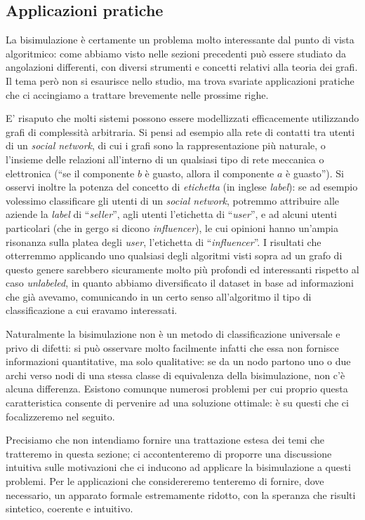 \subsection{Applicazioni pratiche}
La bisimulazione è certamente un problema molto interessante dal punto di vista algoritmico: come abbiamo visto nelle sezioni precedenti può essere studiato da angolazioni differenti, con diversi strumenti e concetti relativi alla teoria dei grafi. Il tema però non si esaurisce nello studio, ma trova svariate applicazioni pratiche che ci accingiamo a trattare brevemente nelle prossime righe.

E' risaputo che molti sistemi possono essere modellizzati efficacemente utilizzando grafi di complessità arbitraria. Si pensi ad esempio alla rete di contatti tra utenti di un \emph{social network}, di cui i grafi sono la rappresentazione più naturale, o l'insieme delle relazioni all'interno di un qualsiasi tipo di rete meccanica o elettronica (``se il componente $b$ è guasto, allora il componente $a$ è guasto''). Si osservi inoltre la potenza del concetto di \emph{etichetta} (in inglese \emph{label}): se ad esempio volessimo classificare gli utenti di un \emph{social network}, potremmo attribuire alle aziende la \emph{label} di ``\emph{seller}'', agli utenti l'etichetta di ``\emph{user}'', e ad alcuni utenti particolari (che in gergo si dicono \emph{influencer}), le cui opinioni hanno un'ampia risonanza sulla platea degli \emph{user}, l'etichetta di ``\emph{influencer}''. I risultati che otterremmo applicando uno qualsiasi degli algoritmi visti sopra ad un grafo di questo genere sarebbero sicuramente molto più profondi ed interessanti rispetto al caso \emph{unlabeled}, in quanto abbiamo diversificato il dataset in base ad informazioni che già avevamo, comunicando in un certo senso all'algoritmo il tipo di classificazione a cui eravamo interessati.

Naturalmente la bisimulazione non è un metodo di classificazione universale e privo di difetti: si può osservare molto facilmente infatti che essa non fornisce informazioni quantitative, ma solo qualitative: se da un nodo partono uno o due archi verso nodi di una stessa classe di equivalenza della bisimulazione, non c'è alcuna differenza. Esistono comunque numerosi problemi per cui proprio questa caratteristica consente di pervenire ad una soluzione ottimale: è su questi che ci focalizzeremo nel seguito.

Precisiamo che non intendiamo fornire una trattazione estesa dei temi che tratteremo in questa sezione; ci accontenteremo di proporre una discussione intuitiva sulle motivazioni che ci inducono ad applicare la bisimulazione a questi problemi. Per le applicazioni che considereremo tenteremo di fornire, dove necessario, un apparato formale estremamente ridotto, con la speranza che risulti sintetico, coerente e intuitivo.

